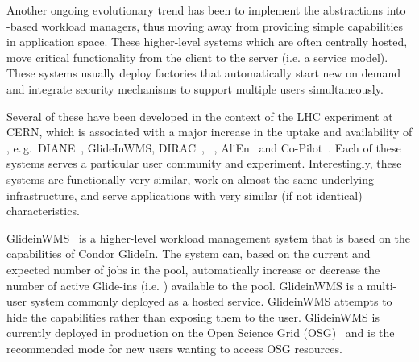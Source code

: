 \documentclass{sig-alternate}
\begin{document}
Another ongoing evolutionary trend has been to implement the \pilot abstractions
into \pilot-based workload managers, thus moving away from providing simple
\pilot capabilities in application space. These higher-level systems which are
often centrally hosted, move critical functionality from the client to the
server (i.e. a service model). These systems usually deploy \pilot factories
that automatically start new \pilots on demand and integrate security mechanisms
to support multiple users simultaneously.

Several of these have been developed in the context of the LHC experiment at
CERN, which is associated with a major increase in the uptake and availability
of \pilots, e.\,g.\ DIANE~\cite{Moscicki:908910}, GlideInWMS,
DIRAC~\cite{1742-6596-219-6-062049}, \panda~\cite{1742-6596-331-7-072069},
AliEn~\cite{1742-6596-119-6-062012} and Co-Pilot~\cite{copilot-tr}. Each of
these \pilotjob systems serves a particular user community and experiment.
Interestingly, these systems are functionally very similar, work on almost the
same underlying infrastructure, and serve applications with very similar (if not
identical) characteristics.


  


GlideinWMS~\cite{1742-6596-119-6-062044} is a higher-level workload management
system that is based on the \pilot capabilities of Condor GlideIn. The system
can, based on the current and expected number of jobs in the pool, automatically
increase or decrease the number of active Glide-ins (i.e. \pilots) available to
the pool. GlideinWMS is a multi-user \pilotjob system commonly deployed as a
hosted service. GlideinWMS attempts to hide the \pilot capabilities rather than
exposing them to the user. GlideinWMS is currently deployed in production on the
Open Science Grid (OSG)~\cite{url_osg} and is the recommended mode for new users
wanting to access OSG resources.
\end{document}
